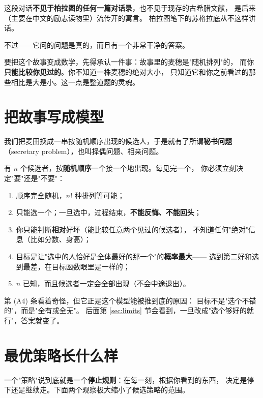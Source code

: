 \documentclass[UTF8,11pt,fontset=macnew]{ctexart}
\begin{document}
\begin{warnbox}
这段对话\textbf{不见于柏拉图的任何一篇对话录}，也不见于现存的古希腊文献，
是后来（主要在中文的励志读物里）流传开的寓言。
柏拉图笔下的苏格拉底从不这样讲话。

不过——它问的问题是真的，而且有一个非常干净的答案。
\end{warnbox}

要把这个故事变成数学，先得承认一件事：故事里的麦穗是"随机排列"的，
而你\textbf{只能比较你见过的}。你不知道一株麦穗的绝对大小，
只知道它和你之前看过的那些相比是大是小。这一点是整道题的灵魂。

\section{把故事写成模型}

我们把麦田换成一串按随机顺序出现的候选人，于是就有了所谓\textbf{秘书问题}
（secretary problem），也叫择偶问题、相亲问题。

\begin{keybox}[模型与假设]
有 $n$ 个候选者，按\textbf{随机顺序}一个接一个地出现。每见完一个，
你必须立刻决定"要"还是"不要"：

\begin{enumerate}[label=(A\arabic*),leftmargin=2.6em]
  \item 顺序完全随机，$n!$ 种排列等可能；
  \item 只能选一个；一旦选中，过程结束，\textbf{不能反悔、不能回头}；
  \item 你只能判断\textbf{相对}好坏（能比较任意两个见过的候选者），
        不知道任何"绝对"信息（比如分数、身高）；
  \item 目标是让"选中的人恰好是全体最好的那一个"的\textbf{概率最大}——
        选到第二好和选到最差，在目标函数眼里是一样的；
  \item $n$ 已知，而且候选者一定会全部出现（不会中途退出）。
\end{enumerate}
\end{keybox}

第 (A4) 条看着奇怪，但它正是这个模型能被推到底的原因：
目标不是"选个不错的"，而是"全有或全无"。
后面第 \ref{sec:limits} 节会看到，一旦改成"选个够好的就行"，答案就变了。

\section{最优策略长什么样}

一个"策略"说到底就是一个\textbf{停止规则}：在每一刻，根据你看到的东西，
决定是停下还是继续走。下面两个观察极大缩小了候选策略的范围。
\end{document}
